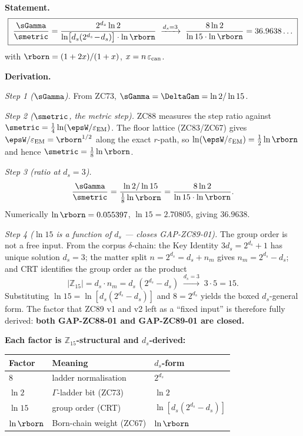 \documentclass[12pt, a4paper]{article}
\renewcommand{\epsEM}{\varepsilon_{\rm EM}}     %
\renewcommand{\epscan}{\varepsilon_{\rm can}}   %
\begin{document}

\begin{giftbox}[title={FIND-ZC89-01: $\sGamma/\smetric
  = 2^{d_s}\ln2/[\ln(d_s(2^{d_s}\!-\!d_s))\,\ln\rborn]$ ($R_0$, Exact ---
  closes GAP-ZC88-01 and GAP-ZC89-01)}]

\textbf{Statement.}
\begin{equation}
  \boxed{\;
    \frac{\sGamma}{\smetric}
    = \frac{2^{d_s}\ln 2}{\ln\!\big[d_s(2^{d_s}\!-\!d_s)\big]\cdot\ln\rborn}
    \;\xrightarrow{d_s=3}\;
    \frac{8\ln 2}{\ln 15\cdot\ln\rborn}
    = 36.9638\ldots
  \;}
  \label{eq:find-main-zc89}
\end{equation}
with $\rborn=(1+2x)/(1+x)$, $x=n\,\epscan$.

\textbf{Derivation.}

\textit{Step 1 ($\sGamma$).}
From ZC73, $\sGamma=\DeltaGam=\ln 2/\ln 15$.

\textit{Step 2 ($\smetric$, the metric step).}
ZC88 measures the step ratio against $\smetric=\tfrac14\ln(\epsW/\epsEM)$.
The floor lattice (ZC83/ZC67) gives $\epsW/\epsEM=\rborn^{1/2}$ along the
exact $r$-path, so $\ln(\epsW/\epsEM)=\tfrac12\ln\rborn$ and hence
$\smetric=\tfrac18\ln\rborn$.

\textit{Step 3 (ratio at $d_s=3$).}
\[
  \frac{\sGamma}{\smetric}
  = \frac{\ln 2/\ln 15}{\tfrac18\ln\rborn}
  = \frac{8\ln 2}{\ln 15\cdot\ln\rborn}.
\]
Numerically $\ln\rborn=0.055397$, $\ln15=2.70805$, giving $36.9638$.

\textit{Step 4 ($\ln 15$ is a function of $d_s$ --- closes GAP-ZC89-01).}
The group order is not a free input. From the corpus $\delta$-chain:
the Key Identity $3d_s=2^{d_s}+1$ has unique solution $d_s=3$; the matter
split $n=2^{d_s}=d_s+n_m$ gives $n_m=2^{d_s}-d_s$; and CRT identifies the
group order as the product
\[
  |\mathbb{Z}_{15}| = d_s\cdot n_m = d_s\,(2^{d_s}-d_s)
  \;\xrightarrow{d_s=3}\; 3\cdot 5 = 15.
\]
Substituting $\ln 15=\ln[d_s(2^{d_s}-d_s)]$ and $8=2^{d_s}$ yields the
boxed $d_s$-general form. The factor that ZC89 v1 and v2 left as a ``fixed
input'' is therefore fully derived: \textbf{both GAP-ZC88-01 and
GAP-ZC89-01 are closed.}

\textbf{Each factor is $\mathbb{Z}_{15}$-structural and $d_s$-derived:}
\begin{center}
{\small\renewcommand{\arraystretch}{1.2}
\begin{tabular}{@{}lll@{}}
\toprule
Factor & Meaning & $d_s$-form \\
\midrule
$8$         & ladder normalisation        & $2^{d_s}$ \\
$\ln 2$     & $\Gamma$-ladder bit (ZC73)   & $\ln 2$ \\
$\ln 15$    & group order (CRT)            & $\ln[d_s(2^{d_s}\!-\!d_s)]$ \\
$\ln\rborn$ & Born-chain weight (ZC67)     & $\ln\rborn$ \\
\bottomrule
\end{tabular}}
\end{center}


\end{giftbox}
\end{document}
